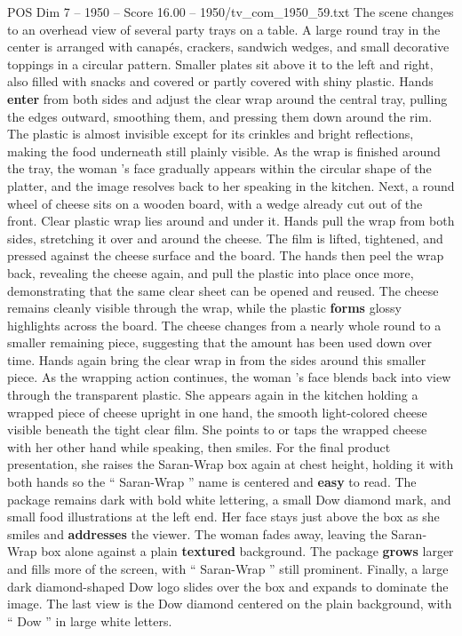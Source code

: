\begin{textsample}{POS Dim 7 – 1950 – Score 16.00 – 1950/tv\_com\_1950\_59.txt}
The scene changes to an overhead view of several party trays on a table.
A large round tray in the center is arranged with canapés, crackers, sandwich wedges, and small decorative toppings in a circular pattern.
Smaller plates sit above it to the left and right, also filled with snacks and covered or partly covered with shiny plastic.
Hands \textbf{enter} from both sides and adjust the clear wrap around the central tray, pulling the edges outward, smoothing them, and pressing them down around the rim.
The plastic is almost invisible except for its crinkles and bright reflections, making the food underneath still plainly visible.
As the wrap is finished around the tray, the woman ’s face gradually appears within the circular shape of the platter, and the image resolves back to her speaking in the kitchen.
Next, a round wheel of cheese sits on a wooden board, with a wedge already cut out of the front.
Clear plastic wrap lies around and under it.
Hands pull the wrap from both sides, stretching it over and around the cheese.
The film is lifted, tightened, and pressed against the cheese surface and the board.
The hands then peel the wrap back, revealing the cheese again, and pull the plastic into place once more, demonstrating that the same clear sheet can be opened and reused.
The cheese remains cleanly visible through the wrap, while the plastic \textbf{forms} glossy highlights across the board.
The cheese changes from a nearly whole round to a smaller remaining piece, suggesting that the amount has been used down over time.
Hands again bring the clear wrap in from the sides around this smaller piece.
As the wrapping action continues, the woman ’s face blends back into view through the transparent plastic.
She appears again in the kitchen holding a wrapped piece of cheese upright in one hand, the smooth light-colored cheese visible beneath the tight clear film.
She points to or taps the wrapped cheese with her other hand while speaking, then smiles.
For the final product presentation, she raises the Saran-Wrap box again at chest height, holding it with both hands so the “ Saran-Wrap ” name is centered and \textbf{easy} to read.
The package remains dark with bold white lettering, a small Dow diamond mark, and small food illustrations at the left end.
Her face stays just above the box as she smiles and \textbf{addresses} the viewer.
The woman fades away, leaving the Saran-Wrap box alone against a plain \textbf{textured} background.
The package \textbf{grows} larger and fills more of the screen, with “ Saran-Wrap ” still prominent.
Finally, a large dark diamond-shaped Dow logo slides over the box and expands to dominate the image.
The last view is the Dow diamond centered on the plain background, with “ Dow ” in large white letters.

\end{textsample}
